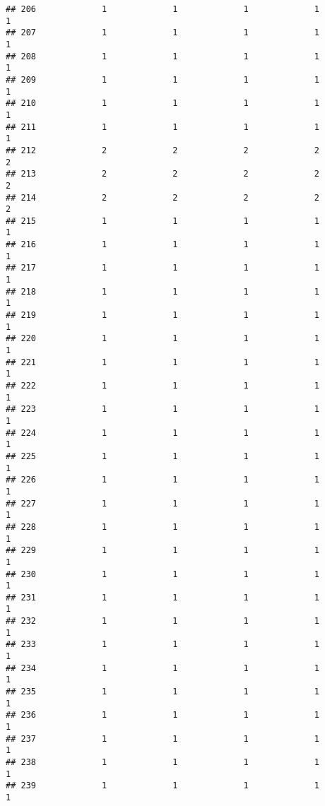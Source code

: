 \documentclass[
]{article}
\begin{document}
\begin{verbatim}
## 206             1             1             1             1             1
## 207             1             1             1             1             1
## 208             1             1             1             1             1
## 209             1             1             1             1             1
## 210             1             1             1             1             1
## 211             1             1             1             1             1
## 212             2             2             2             2             2
## 213             2             2             2             2             2
## 214             2             2             2             2             2
## 215             1             1             1             1             1
## 216             1             1             1             1             1
## 217             1             1             1             1             1
## 218             1             1             1             1             1
## 219             1             1             1             1             1
## 220             1             1             1             1             1
## 221             1             1             1             1             1
## 222             1             1             1             1             1
## 223             1             1             1             1             1
## 224             1             1             1             1             1
## 225             1             1             1             1             1
## 226             1             1             1             1             1
## 227             1             1             1             1             1
## 228             1             1             1             1             1
## 229             1             1             1             1             1
## 230             1             1             1             1             1
## 231             1             1             1             1             1
## 232             1             1             1             1             1
## 233             1             1             1             1             1
## 234             1             1             1             1             1
## 235             1             1             1             1             1
## 236             1             1             1             1             1
## 237             1             1             1             1             1
## 238             1             1             1             1             1
## 239             1             1             1             1             1

\end{verbatim}
\end{document}
